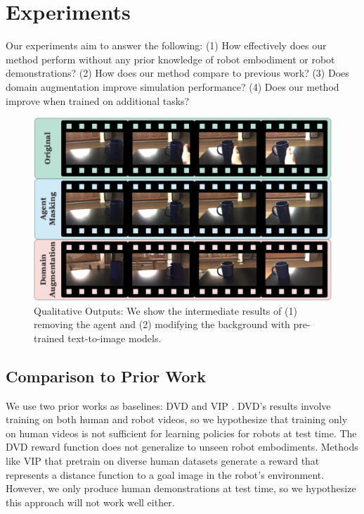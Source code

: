 \section{Experiments}
\label{sec:experiments_reward}

Our experiments aim to answer the following: (1) How effectively does our method perform without any prior knowledge of robot embodiment or robot demonstrations? (2) How does our method compare to previous work? (3) Does domain augmentation improve simulation performance? (4) Does our method improve when trained on additional tasks?

\begin{figure}[H]
\centering
\includegraphics[width=\linewidth]{figs_reward/qual_results.pdf}
\vspace{-0.2in}
   \caption{\small Qualitative Outputs: We show the intermediate results of (1) removing the agent and (2) modifying the background with pre-trained text-to-image models.}
    \label{fig:qual_outputs_reward}
    \vspace{-0.15in}
\end{figure}

\subsection{Comparison to Prior Work}

We use two prior works as baselines: DVD \cite{DVD} and VIP \cite{VIP}. DVD's results involve training on both human and robot videos, so we hypothesize that training only on human videos is not sufficient for learning policies for robots at test time. The DVD reward function does not generalize to unseen robot embodiments. Methods like VIP that pretrain on diverse human datasets generate a reward that represents a distance function to a goal image in the robot's environment. However, we only produce human demonstrations at test time, so we hypothesize this approach will not work well either.

